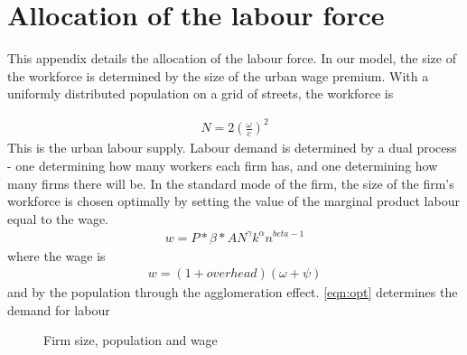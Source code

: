 \chapter{Allocation of the labour force} \label{appendix-Allocation_of_labour}

This appendix details the allocation of the labour force. In our model, the size of the workforce is determined by the size of the urban wage premium. With a uniformly distributed population on a grid of streets, the workforce is
    
\begin{align}\label{eqn:N}
N=2(\frac{\omega}{c})^2    
\end{align}
This is the urban labour supply. Labour demand is determined by a dual process - one determining how many workers each firm has, and one determining how many firms there will be. 
In the standard mode of the firm, the size of the firm's workforce is chosen optimally by setting the value of the marginal product labour equal to the wage.
\begin{align}\label{eqn:opt}
w = P*\beta*AN^\gamma k^\alpha n^{beta-1}    
\end{align}
where the wage is 
\begin{align}\label{eqn:w}
w=(1 + overhead)(\omega + \psi)
\end{align}
and by the population through the agglomeration effect.  \ref{eqn:opt} determines the demand for labour

\begin{figure}
    \centering
    \caption{Firm size, population and wage}
    \label{fig:n_N_w}
\end{figure}

